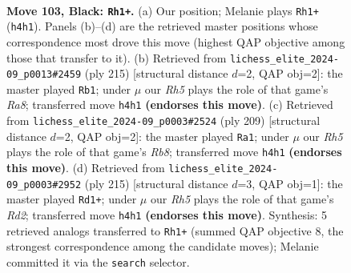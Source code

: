 \documentclass[11pt]{article}
\begin{document}
\clearpage

\begin{figure}[p]\centering
\begin{subfigure}{0.46\textwidth}\centering
\resizebox{\linewidth}{!}{%
\newchessgame
\chessboard[
  setfen={5R2/8/4k3/8/7r/r7/8/5K2 b - - 17 103},
  showmover=false,
  pgfstyle=straightmove, color=movearrow, markmove={h4-h1}
]}
\caption{}
\end{subfigure}\hfill
\begin{subfigure}{0.46\textwidth}\centering
\resizebox{\linewidth}{!}{%
\newchessgame
\chessboard[
  setfen={8/6K1/8/8/3k4/6R1/8/r7 b - - 88 108},
  showmover=false,
  pgfstyle=straightmove, color=movearrow, markmove={a1-b1}
]}
\caption{}
\end{subfigure}
\\[4pt]
\begin{subfigure}{0.46\textwidth}\centering
\resizebox{\linewidth}{!}{%
\newchessgame
\chessboard[
  setfen={8/8/3k4/6R1/8/6K1/8/1r6 b - - 13 105},
  showmover=false,
  pgfstyle=straightmove, color=movearrow, markmove={b1-a1}
]}
\caption{}
\end{subfigure}\hfill
\begin{subfigure}{0.46\textwidth}\centering
\resizebox{\linewidth}{!}{%
\newchessgame
\chessboard[
  setfen={8/3r4/8/8/8/6R1/8/1k4K1 b - - 76 108},
  showmover=false,
  pgfstyle=straightmove, color=movearrow, markmove={d7-d1}
]}
\caption{}
\end{subfigure}
\caption{\textbf{Move 103, Black: \texttt{Rh1+}.} (a) Our position; Melanie plays \texttt{Rh1+} (\texttt{h4h1}). Panels (b)--(d) are the retrieved master positions whose correspondence most drove this move (highest QAP objective among those that transfer to it). (b) Retrieved from \texttt{lichess\_elite\_2024-09\_p0013\#2459} (ply 215) [structural distance $d$=2, QAP obj=2]: the master played \texttt{Rb1}; under $\mu$ our \emph{Rh5} plays the role of that game's \emph{Ra8}; transferred move \texttt{h4h1} \textbf{(endorses this move)}. (c) Retrieved from \texttt{lichess\_elite\_2024-09\_p0003\#2524} (ply 209) [structural distance $d$=2, QAP obj=2]: the master played \texttt{Ra1}; under $\mu$ our \emph{Rh5} plays the role of that game's \emph{Rb8}; transferred move \texttt{h4h1} \textbf{(endorses this move)}. (d) Retrieved from \texttt{lichess\_elite\_2024-09\_p0003\#2952} (ply 215) [structural distance $d$=3, QAP obj=1]: the master played \texttt{Rd1+}; under $\mu$ our \emph{Rh5} plays the role of that game's \emph{Rd2}; transferred move \texttt{h4h1} \textbf{(endorses this move)}. Synthesis: 5 retrieved analogs transferred to \texttt{Rh1+} (summed QAP objective 8, the strongest correspondence among the candidate moves); Melanie committed it via the \texttt{search} selector.}
\label{fig:thought-m205}
\end{figure}
\end{document}

